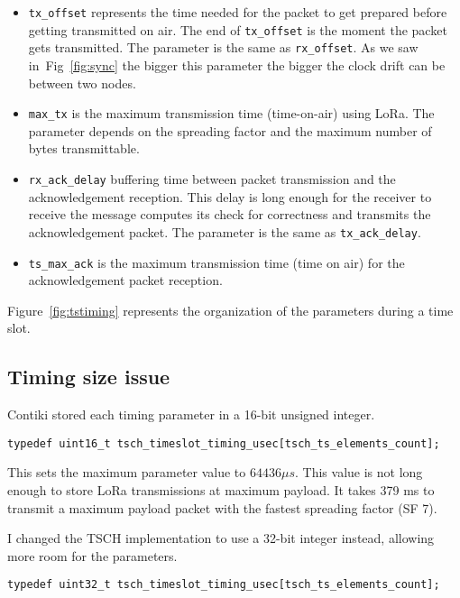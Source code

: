 \begin{itemize}
  \item \lstinline{tx_offset} represents the time needed for the packet to get
    prepared before getting transmitted on air. The end of
    \lstinline{tx_offset} is the moment the packet gets transmitted.
    The parameter is the same as \lstinline{rx_offset}.
    As we saw in~Fig~\ref{fig:sync} the bigger this parameter the bigger the
    clock drift can be between two nodes.
  \item \lstinline{max_tx} is the maximum transmission time (time-on-air) using
    LoRa. The parameter depends on the spreading factor and the maximum number
    of bytes transmittable.
  \item \lstinline{rx_ack_delay} buffering time between packet transmission and
    the acknowledgement reception. This delay is long enough for the receiver
    to receive the message computes its check for correctness and transmits the acknowledgement packet.
    The parameter is the same as \lstinline{tx_ack_delay}.
  \item \lstinline{ts_max_ack} is the maximum transmission time (time on air) for
    the acknowledgement packet reception.
\end{itemize}

Figure~\ref{fig:tstiming} represents the organization of the parameters during
a time slot.



\subsection{Timing size issue}

Contiki stored each timing parameter in a 16-bit unsigned integer.

\begin{lstlisting}
typedef uint16_t tsch_timeslot_timing_usec[tsch_ts_elements_count];
\end{lstlisting}

This sets the maximum parameter value to $64436\mu s$.
This value is not long enough to store LoRa transmissions at maximum payload.
It takes 379 ms to transmit a maximum payload packet with the fastest spreading
factor (SF 7).

I changed the TSCH implementation to use a 32-bit integer instead, allowing more
room for the parameters.

\begin{lstlisting}
typedef uint32_t tsch_timeslot_timing_usec[tsch_ts_elements_count];
\end{lstlisting}

